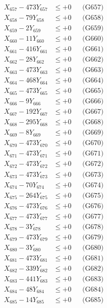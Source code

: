 \documentclass[a4paper,10pt]{article}
\begin{document}
{\begin{align}
X_{657} - 473Y_{657} &\leq +0 && \text{(G657)} \\
X_{658} - 79Y_{658} &\leq +0 && \text{(G658)} \\
X_{659} - 2Y_{659} &\leq +0 && \text{(G659)} \\
X_{660} - 11Y_{660} &\leq +0 && \text{(G660)} \\
\allowbreak
X_{661} - 416Y_{661} &\leq +0 && \text{(G661)} \\
X_{662} - 28Y_{662} &\leq +0 && \text{(G662)} \\
X_{663} - 473Y_{663} &\leq +0 && \text{(G663)} \\
X_{664} - 468Y_{664} &\leq +0 && \text{(G664)} \\
X_{665} - 473Y_{665} &\leq +0 && \text{(G665)} \\
X_{666} - 9Y_{666} &\leq +0 && \text{(G666)} \\
X_{667} - 192Y_{667} &\leq +0 && \text{(G667)} \\
X_{668} - 295Y_{668} &\leq +0 && \text{(G668)} \\
X_{669} - 8Y_{669} &\leq +0 && \text{(G669)} \\
X_{670} - 473Y_{670} &\leq +0 && \text{(G670)} \\
\allowbreak
X_{671} - 473Y_{671} &\leq +0 && \text{(G671)} \\
X_{672} - 473Y_{672} &\leq +0 && \text{(G672)} \\
X_{673} - 473Y_{673} &\leq +0 && \text{(G673)} \\
X_{674} - 70Y_{674} &\leq +0 && \text{(G674)} \\
X_{675} - 264Y_{675} &\leq +0 && \text{(G675)} \\
X_{676} - 473Y_{676} &\leq +0 && \text{(G676)} \\
X_{677} - 473Y_{677} &\leq +0 && \text{(G677)} \\
X_{678} - 3Y_{678} &\leq +0 && \text{(G678)} \\
X_{679} - 473Y_{679} &\leq +0 && \text{(G679)} \\
X_{680} - 3Y_{680} &\leq +0 && \text{(G680)} \\
\allowbreak
X_{681} - 473Y_{681} &\leq +0 && \text{(G681)} \\
X_{682} - 339Y_{682} &\leq +0 && \text{(G682)} \\
X_{683} - 441Y_{683} &\leq +0 && \text{(G683)} \\
X_{684} - 48Y_{684} &\leq +0 && \text{(G684)} \\
X_{685} - 14Y_{685} &\leq +0 && \text{(G685)} \\

\end{align}}
\end{document}
